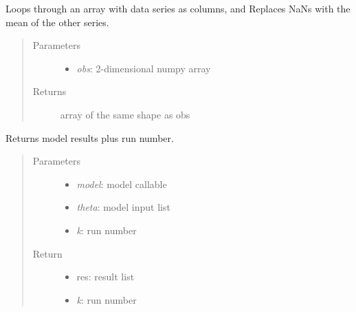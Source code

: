 \documentclass[a4paper,10pt,english]{sphinxmanual}
\begin{document}
\begin{fulllineitems}
\label{BIP.Bayes:BIP.Bayes.Melding.clearNaN}
Loops through an array with data series as columns, and 
Replaces NaNs with the mean of the other series.
\begin{quote}\begin{description}
\item[{Parameters}] \leavevmode\begin{itemize}
\item {} 
\emph{obs}: 2-dimensional numpy array

\end{itemize}

\item[{Returns}] \leavevmode
array of the same shape as obs

\end{description}\end{quote}

\end{fulllineitems}


\begin{fulllineitems}
\label{BIP.Bayes:BIP.Bayes.Melding.enumRun}
Returns model results plus run number.
\begin{quote}\begin{description}
\item[{Parameters}] \leavevmode\begin{itemize}
\item {} 
\emph{model}: model callable

\item {} 
\emph{theta}: model input list

\item {} 
\emph{k}: run number

\end{itemize}

\item[{Return}] \leavevmode\begin{itemize}
\item {} 
res: result list

\item {} 
\emph{k}: run number

\end{itemize}

\end{description}\end{quote}

\end{fulllineitems}
\end{document}
